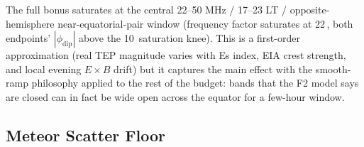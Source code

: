\documentclass[11pt,a4paper]{article}
\newcommand{\SI}[2]{#1\,\text{#2}}
\newcommand{\MHz}{\text{MHz}}
\begin{document}
The full bonus saturates at the central
22--50 MHz / 17--23 LT / opposite-hemisphere near-equatorial-pair
window (frequency factor saturates at \SI{22}{\MHz}, both
endpoints' $|\phi_{\text{dip}}|$ above the 10\textdegree\
saturation knee).  This is a first-order approximation (real
TEP magnitude varies with Es index, EIA crest strength, and local
evening $E \times B$ drift) but it captures the main effect
with the smooth-ramp philosophy applied to the rest of the
budget: bands that the F2 model says are closed can in fact be
wide open across the equator for a few-hour window.

\subsection{Meteor Scatter Floor}\label{sec:ms}
\end{document}
